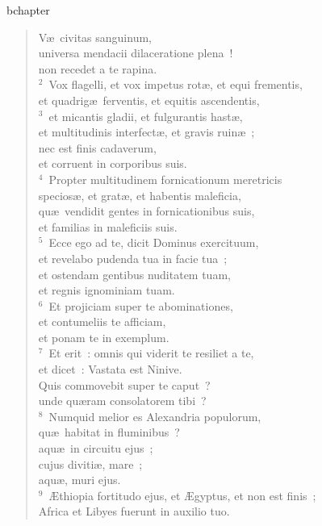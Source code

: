 bchapter\begin{flushleft}\begin{verse}\vspace{-19pt}V\ae\ civitas sanguinum,\\ universa mendacii dilaceratione plena~!\\ non recedet a te rapina.\\
${}^{2}$~Vox flagelli, et vox impetus rot\ae , et equi frementis,\\ et quadrig\ae\ ferventis, et equitis ascendentis,\\
${}^{3}$~et micantis gladii, et fulgurantis hast\ae ,\\ et multitudinis interfect\ae , et gravis ruin\ae~;\\ nec est finis cadaverum,\\ et corruent in corporibus suis.\\
${}^{4}$~Propter multitudinem fornicationum meretricis\\ specios\ae , et grat\ae , et habentis maleficia,\\ qu\ae\ vendidit gentes in fornicationibus suis,\\ et familias in maleficiis suis.\\
${}^{5}$~Ecce ego ad te, dicit Dominus exercituum,\\ et revelabo pudenda tua in facie tua~;\\ et ostendam gentibus nuditatem tuam,\\ et regnis ignominiam tuam.\\
${}^{6}$~Et projiciam super te abominationes,\\ et contumeliis te afficiam,\\ et ponam te in exemplum.\\
${}^{7}$~Et erit~: omnis qui viderit te resiliet a te,\\ et dicet~: Vastata est Ninive.\\ Quis commovebit super te caput~?\\ unde qu\ae ram consolatorem tibi~?\\
${}^{8}$~Numquid melior es Alexandria populorum,\\ qu\ae\ habitat in fluminibus~?\\ aqu\ae\ in circuitu ejus~;\\ cujus diviti\ae , mare~;\\ aqu\ae , muri ejus.\\
${}^{9}$~\AE thiopia fortitudo ejus, et \AE gyptus, et non est finis~;\\ Africa et Libyes fuerunt in auxilio tuo.\\

\end{verse}
\end{flushleft}
